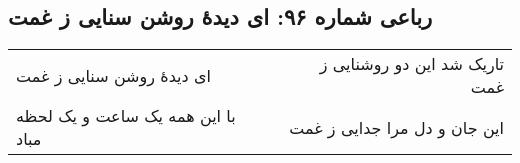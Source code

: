 \begin{center}
\section*{رباعی شماره ۹۶: ای دیدهٔ روشن سنایی ز غمت}
\label{sec:sh096}
\begin{longtable}{l p{0.5cm} r}
ای دیدهٔ روشن سنایی ز غمت
&&
تاریک شد این دو روشنایی ز غمت
\\
با این همه یک ساعت و یک لحظه مباد
&&
این جان و دل مرا جدایی ز غمت
\\
\end{longtable}
\end{center}
